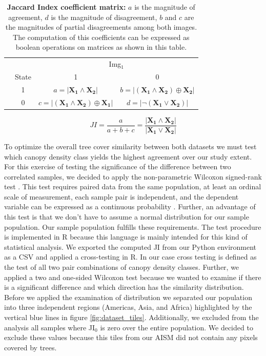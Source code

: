 			\begin{table}[ht]
				\centering
				\caption[Jaccard Index coefficient matrix]{\textbf{Jaccard Index coefficient matrix:} $a$ is the magnitude of agreement, $d$ is the magnitude of disagreement, $b$ and $c$ are the magnitudes of partial disagreements among both images. The computation of this coefficients can be expressed as boolean operations on matrices as shown in this table.}
				\label{tab:jaccard_matrix}
				\begin{tabular}{lccc}
					\hline
					& & \multicolumn{2}{c}{Img$_1$} \\
					& State & 1 & 0 \\\hline
					\multirow{2}{*}{\STAB{\rotatebox[origin=c]{90}{Img$_2$}}} & 1 & $a=|\mathbf{X_1} \land \mathbf{X_2}|$ & $b=|(\mathbf{X_1} \land \mathbf{X_2}) \oplus \mathbf{X_2}| $ \\ 
					& 0 & $c=|(\mathbf{X_1} \land \mathbf{X_2}) \oplus \mathbf{X_1}|$ & $d=|\neg ( \mathbf{X_1} \lor \mathbf{X_2})|$ \\\hline 
				\end{tabular}
			\end{table}
			\begin{equation}
			\label{eq:jaccard_index}
				JI = \frac{a}{a+b+c} = \frac{|\mathbf{X_1} \land \mathbf{X_2}|}{|\mathbf{X_1} \lor \mathbf{X_2}|}
			\end{equation}

			To optimize the overall tree cover similarity between both datasets we must test which canopy density class yields the highest agreement over our study extent. For this exercise of testing the significance of the difference between two correlated samples, we decided to apply the non-parametric Wilcoxon signed-rank test \citep{Wilcoxon1945}. This test requires paired data from the same population, at least an ordinal scale of measurement, each sample pair is independent, and the dependent variable can be expressed as a continuous probability \citep{Lowry2019}. Further, an advantage of this test is that we don't have to assume a normal distribution for our sample population. Our sample population fulfills these requirements. The test procedure is implemented in R because this language is mainly intended for this kind of statistical analysis. We exported the computed \ac{JI} from our Python environment as a \ac{CSV} and applied a cross-testing in R. In our case cross testing is defined as the test of all two pair combinations of canopy density classes. Further, we applied a two and one-sided Wilcoxon test because we wanted to examine if there is a significant difference and which direction has the similarity distribution. Before we applied the examination of distribution we separated our population into three independent regions (Americas, Asia, and Africa) highlighted by the vertical blue lines in figure \ref{fig:dataset_tiles}. Additionally, we excluded from the analysis all samples where JI$_0$ is zero over the entire population. We decided to exclude these values because this tiles from our \ac{AISM} did not contain any pixels covered by trees.
 
